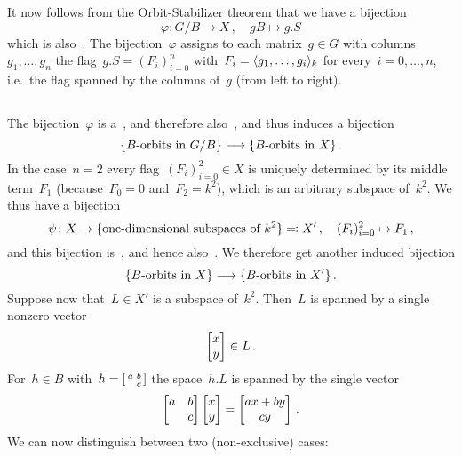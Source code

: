 It now follows from the Orbit-Stabilizer theorem that we have a bijection
\[
          \varphi
  \colon  G/B
  \to     X \,,
  \quad   gB
  \mapsto g.S
\]
which is also~.
The bijection~$\varphi$ assigns to each matrix~$g \in G$ with columns~$g_1, \dotsc, g_n$ the flag~$g.S = (F_i)_{i=0}^n$ with~$F_i = \langle g_1, \dotsc, g_i\rangle_k$ for every~$i = 0, \dotsc, n$, i.e.\ the flag spanned by the columns of~$g$ (from left to right).





\subsection{}

The bijection~$\varphi$ is a~, and therefore also~, and thus induces a bijection
\[
          \{\text{\dash{$B$}{orbits} in~$G/B$}\}
  \longto \{\text{\dash{$B$}{orbits} in~$X$}\} \,.
\]
In the case~$n = 2$ every flag~$(F_i)_{i=0}^2 \in X$ is uniquely determined by its middle term~$F_1$ (because~$F_0 = 0$ and~$F_2 = k^2$), which is an arbitrary  subspace of~$k^2$.
We thus have a bijection
\[
            \psi
  \colon    X
  \to       \{ \text{\dash{one}{dimensional} subspaces of~$k^2$} \}
  \defines  X'  \,,
  \quad     (F_i)_{i=0}^2
  \mapsto   F_1 \,,
\]
and this bijection is~, and hence also~.
We therefore get another induced bijection
\[
          \{\text{\dash{$B$}{orbits} in~$X$}\}
  \longto \{\text{\dash{$B$}{orbits} in~$X'$}\} \,.
\]
Suppose now that~$L \in X'$ is a  subspace of~$k^2$.
Then~$L$ is spanned by a single nonzero vector
\[
      \begin{bmatrix} x \\ y \end{bmatrix}
  \in L \,.
\]
For~$h \in B$ with~$h = \begin{bsmallmatrix} a & b \\ {} & c \end{bsmallmatrix}$ the space~$h.L$ is spanned by the single vector
\begin{equation}
  \label{action of triangle on vector}
  \begin{bmatrix}
    a   & b \\
    {}  & c
  \end{bmatrix}
  \begin{bmatrix} x \\ y \end{bmatrix}
  =
  \begin{bmatrix} ax + by \\ cy \end{bmatrix} \,.
\end{equation}
We can now distinguish between two (non-exclusive) cases:
